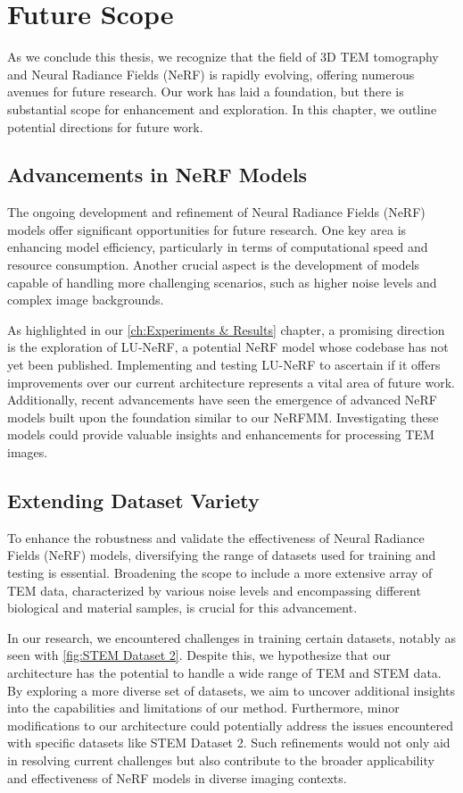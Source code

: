 \chapter{Future Scope}\label{ch:Future Work}

As we conclude this thesis, we recognize that the field of 3D TEM tomography and Neural Radiance Fields (NeRF) is rapidly evolving, offering numerous avenues for future research. Our work has laid a foundation, but there is substantial scope for enhancement and exploration. In this chapter, we outline potential directions for future work.

\section{Advancements in NeRF Models}
The ongoing development and refinement of Neural Radiance Fields (NeRF) models offer significant opportunities for future research. One key area is enhancing model efficiency, particularly in terms of computational speed and resource consumption. Another crucial aspect is the development of models capable of handling more challenging scenarios, such as higher noise levels and complex image backgrounds.
\vspace{10pt}

As highlighted in our \ref{ch:Experiments & Results} chapter, a promising direction is the exploration of LU-NeRF, a potential NeRF model whose codebase has not yet been published. Implementing and testing LU-NeRF to ascertain if it offers improvements over our current architecture represents a vital area of future work. Additionally, recent advancements have seen the emergence of advanced NeRF models built upon the foundation similar to our NeRFMM. Investigating these models could provide valuable insights and enhancements for processing TEM images.


\section{Extending Dataset Variety}
To enhance the robustness and validate the effectiveness of Neural Radiance Fields (NeRF) models, diversifying the range of datasets used for training and testing is essential. Broadening the scope to include a more extensive array of TEM data, characterized by various noise levels and encompassing different biological and material samples, is crucial for this advancement. 

\vspace{10pt}
In our research, we encountered challenges in training certain datasets, notably as seen with \ref{fig:STEM Dataset 2}. Despite this, we hypothesize that our architecture has the potential to handle a wide range of TEM and STEM data. By exploring a more diverse set of datasets, we aim to uncover additional insights into the capabilities and limitations of our method. Furthermore, minor modifications to our architecture could potentially address the issues encountered with specific datasets like STEM Dataset 2. Such refinements would not only aid in resolving current challenges but also contribute to the broader applicability and effectiveness of NeRF models in diverse imaging contexts.
  

